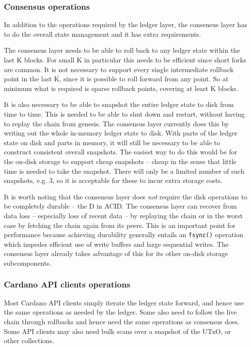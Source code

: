 \documentclass[11pt,a4paper]{article}
\begin{document}
\subsubsection{Consensus operations}

In addition to the operations required by the ledger layer, the consensus layer
has to do the overall state management and it has extra requirements.

The consensus layer needs to be able to roll back to any ledger state within the
last K blocks. For small K in particular this needs to be efficient since short
forks are common. It is not necessary to support every single intermediate
rollback point in the last K, since it is possible to roll forward from any
point. So at minimum what is required is sparse rollback points, covering at
least K blocks.

It is also necessary to be able to snapshot the entire ledger state to disk
from time to time. This is needed to be able to shut down and restart, without
having to replay the chain from genesis. The consensus layer currently does
this by writing out the whole in-memory ledger state to disk. With parts of
the ledger state on disk and parts in memory, it will still be necessary to
be able to construct consistent overall snapshots. The easiest way to do this
would be for the on-disk storage to support cheap snapshots -- cheap in the
sense that little time is needed to take the snapshot. There will only be a
limited number of such snapshots, e.g. 3, so it is acceptable for these to
incur extra storage costs.

It is worth noting that the consensus layer does \emph{not} require the disk
operations to be completely durable -- the D in ACID. The consensus layer can
recover from data loss -- especially loss of recent data -- by replaying the
chain or in the worst case by fetching the chain again from its peers. This is
an important point for performance because achieving durability generally
entails an {\tt fsync()} operation which impedes efficient use of write buffers
and large sequential writes. The consensus layer already takes advantage of
this for its other on-disk storage subcomponents.

\subsubsection{Cardano API clients operations}

Most Cardano API clients simply iterate the ledger state forward, and hence use
the same operations as needed by the ledger. Some also need to follow the live
chain through rollbacks and hence need the same operations as consensus does.
Some API clients may also need bulk {\sc scan}s over a snapshot of the UTxO,
or other collections.
\end{document}
